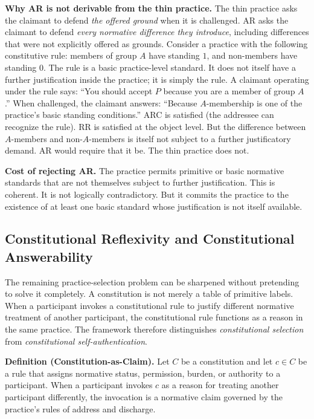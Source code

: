 \documentclass[11pt]{article}
\begin{document}
\textbf{Why AR is not derivable from the thin practice.} The thin practice asks the claimant to defend \emph{the offered ground} when it is challenged. AR asks the claimant to defend \emph{every normative difference they introduce}, including differences that were not explicitly offered as grounds. Consider a practice with the following constitutive rule: members of group $A$ have standing $1$, and non-members have standing $0$. The rule is a basic practice-level standard. It does not itself have a further justification inside the practice; it is simply the rule. A claimant operating under the rule says: ``You should accept $P$ because you are a member of group $A$.'' When challenged, the claimant answers: ``Because $A$-membership is one of the practice's basic standing conditions.'' ARC is satisfied (the addressee can recognize the rule). RR is satisfied at the object level. But the difference between $A$-members and non-$A$-members is itself not subject to a further justificatory demand. AR would require that it be. The thin practice does not.

\textbf{Cost of rejecting AR.} The practice permits primitive or basic normative standards that are not themselves subject to further justification. This is coherent. It is not logically contradictory. But it commits the practice to the existence of at least one basic standard whose justification is not itself available.

\subsection{Constitutional Reflexivity and Constitutional Answerability}
The remaining practice-selection problem can be sharpened without pretending to solve it completely. A constitution is not merely a table of primitive labels. When a participant invokes a constitutional rule to justify different normative treatment of another participant, the constitutional rule functions as a reason in the same practice. The framework therefore distinguishes \emph{constitutional selection} from \emph{constitutional self-authentication}.

\begin{paperbox}
\textbf{Definition (Constitution-as-Claim).} Let $C$ be a constitution and let $c\in C$ be a rule that assigns normative status, permission, burden, or authority to a participant. When a participant invokes $c$ as a reason for treating another participant differently, the invocation is a normative claim governed by the practice's rules of address and discharge.
\end{paperbox}
\end{document}
